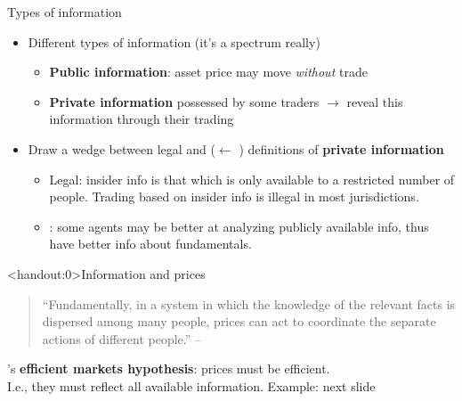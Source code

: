 \documentclass[english,10pt
,aspectratio=169
]{beamer}
\begin{document}
\begin{frame}{Types of information}
	\begin{itemize}
		\item Different types of information (it's a spectrum really)
		\begin{itemize}
			\item \textbf{Public information}:  asset price may move \textit{without} trade
			\item \textbf{Private information} possessed by some traders  $\rightarrow$ reveal this information through their trading
		\end{itemize}
		\pause
		\item Draw a wedge between \alert{legal} and  ($\leftarrow$ ) definitions of \textbf{private information}
		\begin{itemize}
			\item \alert{Legal}: insider info is that which is only available to a restricted number of people. Trading based on insider info is illegal in most jurisdictions.
			\item {}: some agents may be better at analyzing publicly available info, thus have better info about fundamentals.
		\end{itemize}
	\end{itemize}
\end{frame}


\begin{frame}<handout:0>{Information and prices}
	\begin{quotation}
		``Fundamentally, in a system in which the knowledge of the relevant facts is dispersed among many people, prices can act to coordinate the separate actions of different people.'' -- 
	\end{quotation}
	\pause
	
	's \textbf{efficient markets hypothesis}: {prices} must be {efficient}.
	\\
	I.e., they must reflect all available information. Example: next slide
\end{frame}
\end{document}
